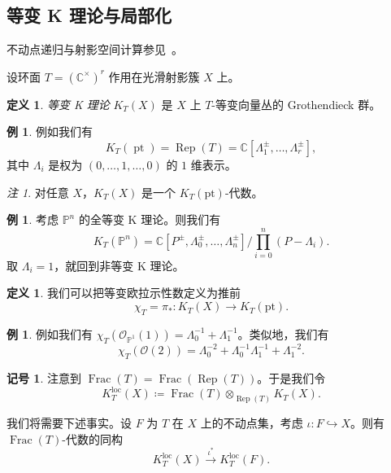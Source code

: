 \documentclass{amsart}
\theoremstyle{definition}
\newtheorem{defn}[thm]{定义}
\newtheorem{exm}[thm]{例}
\newtheorem{notn}[thm]{记号}
\theoremstyle{remark}
\newtheorem{rmk}[thm]{注}
\theoremstyle{plain}
\theoremstyle{definition}
\theoremstyle{remark}
\newcommand{\C}{\mathbb{C}}
\renewcommand{\P}{\mathbb{P}}
\newcommand{\mc}[1]{\mathcal{#1}}
\newcommand{\mr}[1]{\mathrm{#1}}
\newcommand{\on}[1]{\operatorname{#1}}
\newcommand{\1}{\mathbf{1}}
\newcommand{\2}{\mathbf{2}}
\newcommand{\3}{\mathbf{3}}
\newcommand{\loc}{\mr{loc}}
\begin{document}
\subsection{等变 K 理论与局部化}%
\label{sub:Equivariant K-theory and localization}

不动点递归与射影空间计算参见~\cite{GiventalK2}。

设环面 \(T = (\C^{\times})^r\) 作用在光滑射影簇 \(X\) 上。

\begin{defn}
    \textit{等变 K 理论} \(K_T(X)\) 是 \(X\) 上 \(T\)-等变向量丛的 Grothendieck 群。
\end{defn}

\begin{exm}
    例如我们有
    \[ K_T(\on{pt}) = \on{Rep}(T) = \C[\Lambda_1^{\pm}, \ldots, \Lambda_r^{\pm}], \]
    其中 \(\Lambda_i\) 是权为 \((0, \ldots, 1, \ldots, 0)\) 的 \(1\) 维表示。
\end{exm}

\begin{rmk}
    对任意 \(X\)，\(K_T(X)\) 是一个 \(K_T(\mr{pt})\)-代数。
\end{rmk}

\begin{exm}
    考虑 \(\P^n\) 的全等变 K 理论。则我们有
    \[ K_T(\P^n) = \C[P^{\pm}, \Lambda_0^{\pm}, \ldots, \Lambda_n^{\pm}] \big/ \prod_{i=0}^n (P-\Lambda_i). \]
    取 \(\Lambda_i = 1\)，就回到非等变 K 理论。
\end{exm}

\begin{defn}
    我们可以把等变欧拉示性数定义为推前
    \[ \chi_T = \pi_* \colon K_T(X) \to K_T(\mr{pt}). \]
\end{defn}

\begin{exm}
    例如我们有 \(\chi_T(\mc{O}_{\P^1}(1)) = \Lambda_0^{-1} + \Lambda_1^{-1}\)。类似地，我们有
    \[ \chi_T(\mc{O}(2)) = \Lambda_0^{-2} + \Lambda_0^{-1} \Lambda_1^{-1} + \Lambda_1^{-2}. \]
\end{exm}

\begin{notn}
    注意到 \(\on{Frac}(T) = \on{Frac}(\on{Rep}(T))\)。于是我们令
    \[ K_T^{\loc}(X) \coloneqq \on{Frac}(T) \otimes_{\on{Rep}(T)} K_T(X). \]
\end{notn}

我们将需要下述事实。设 \(F\) 为 \(T\) 在 \(X\) 上的不动点集，考虑 \(\iota \colon F \hookrightarrow X\)。则有 \(\on{Frac}(T)\)-代数的同构
\[ K_T^{\loc}(X) \xrightarrow{\iota^*} K_T^{\loc}(F). \]
\end{document}
